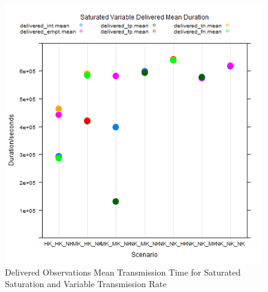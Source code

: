 	\begin{figure}[H]
	\centering
	\includegraphics[width=\textwidth]{Chap7/figures/plots/saturated_variable/delivered_mean.png}
	\caption{Delivered Observations Mean Transmission Time for Saturated Saturation and Variable Transmission Rate}
	\label{fig:sim:res:sat:variable:delmean}
	\end{figure}

